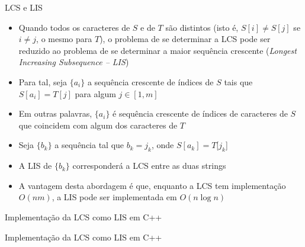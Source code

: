 \begin{frame}[fragile]{LCS e LIS}

    \begin{itemize}
        \item Quando todos os caracteres de $S$ e de $T$ são distintos (isto é, 
            $S[i] \neq S[j]$ se $i \neq j$, o mesmo para $T$), o problema de se determinar a LCS 
            pode ser reduzido ao problema de se determinar a maior sequência crescente 
            (\textit{Longest Increasing Subsequence -- LIS})

        \item Para tal, seja $\lbrace a_i\rbrace$ a sequência crescente de índices de $S$ tais que
            $S[a_i] = T[j]$ para algum $j\in [1,m]$

        \item Em outras palavras, $\lbrace a_i\rbrace$ é sequência crescente de índices de 
            caracteres de $S$ que coincidem com algum dos caracteres de $T$

        \item Seja $\lbrace b_k\rbrace$ a sequência tal que $b_k = j_k$, onde $S[a_k] = T[j_k$] 

        \item A LIS de $\lbrace b_k\rbrace$ corresponderá a LCS entre as duas strings

        \item A vantagem desta abordagem é que, enquanto a LCS tem implementação $O(nm)$, a LIS 
            pode ser implementada em $O(n \log n)$

    \end{itemize}

\end{frame}



\begin{frame}[fragile]{Implementação da LCS como LIS em C++}
\end{frame}

\begin{frame}[fragile]{Implementação da LCS como LIS em C++}
\end{frame}
